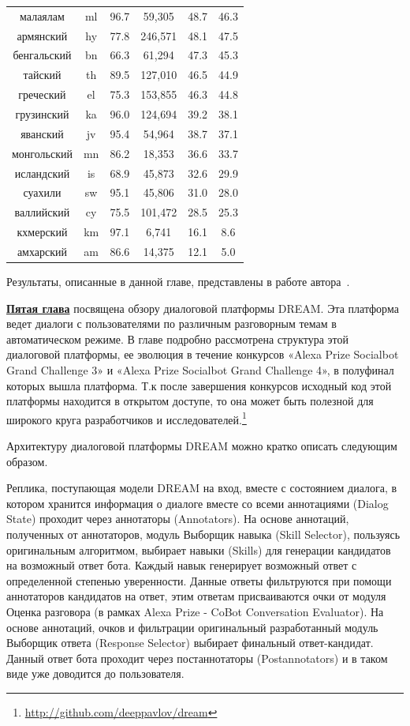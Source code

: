 \begin{table}
{\begin{tabular}{|c|c|c||c|c|c|}
малаялам & ml & 96.7 & 59,305 & 48.7 & 46.3\\
армянский & hy & 77.8 & 246,571 & 48.1 & 47.5\\
бенгальский & bn & 66.3 & 61,294 & 47.3 & 45.3\\
тайский & th & 89.5 & 127,010 & 46.5 & 44.9\\
греческий & el & 75.3 & 153,855 & 46.3 & 44.8\\
грузинский & ka & 96.0 & 124,694 & 39.2 & 38.1\\
яванский & jv & 95.4 & 54,964 & 38.7 & 37.1\\
монгольский & mn & 86.2 & 18,353 & 36.6 & 33.7\\
исландский & is & 68.9 & 45,873 & 32.6 & 29.9\\
суахили & sw & 95.1 & 45,806 & 31.0 & 28.0\\
валлийский & cy & 75.5 & 101,472 & 28.5 & 25.3\\
кхмерский & km & 97.1 & 6,741 & 16.1 & 8.6\\
амхарский & am & 86.6 & 14,375 & 12.1 & 5.0\\ \hline
\end{tabular}
}
\end{table}

Результаты, описанные в данной главе, представлены в работе автора~\cite{rutopics}.

\underline{\textbf{Пятая глава}} посвящена обзору диалоговой платформы DREAM. Эта платформа ведет диалоги с пользователями по различным разговорным темам в автоматическом режиме. В главе подробно рассмотрена структура этой диалоговой платформы, ее эволюция в течение конкурсов «Alexa Prize Socialbot Grand Challenge 3» и «Alexa Prize Socialbot Grand Challenge 4», в полуфинал которых вышла платформа. Т.к после завершения конкурсов исходный код этой платформы находится в открытом доступе, то она может быть полезной для широкого круга разработчиков и исследователей.\footnote{\url{http://github.com/deeppavlov/dream}}

Архитектуру диалоговой платформы DREAM можно кратко описать следующим образом. %

Реплика, поступающая модели {DREAM} на вход, вместе с состоянием диалога, в котором хранится информация о диалоге вместе со всеми аннотациями (Dialog State) проходит через аннотаторы (Annotators). На основе аннотаций, полученных от аннотаторов, модуль Выборщик навыка (Skill Selector), пользуясь оригинальным алгоритмом, выбирает навыки (Skills) для генерации кандидатов на возможный ответ бота. Каждый навык генерирует возможный ответ с определенной степенью уверенности. Данные ответы фильтруются при помощи аннотаторов кандидатов на ответ, этим ответам присваиваются очки от модуля Оценка разговора (в рамках Alexa Prize - CoBot Conversation Evaluator). На основе аннотаций, очков и фильтрации оригинальный разработанный модуль Выборщик ответа (Response Selector) выбирает финальный ответ-кандидат. Данный ответ бота проходит через постаннотаторы (Postannotators) и в таком виде уже доводится до пользователя.

